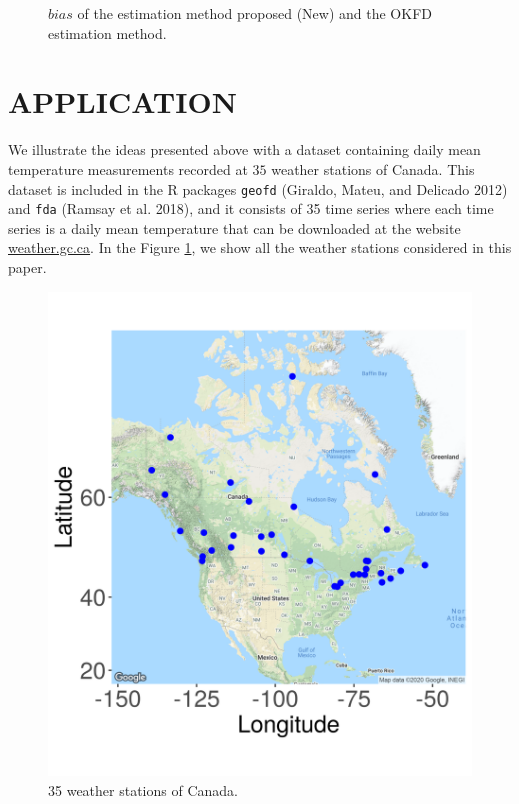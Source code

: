 \documentclass[
  12pt,
]{article}
\theoremstyle{definition}
\theoremstyle{definition}
\theoremstyle{definition}
\theoremstyle{remark}
\begin{document}
\begin{figure}[htbp]
    \caption{$bias$ of the estimation method proposed (New) and the OKFD estimation method.}
\end{figure}

\newpage

\hypertarget{sec:application}{%
\section{APPLICATION}\label{sec:application}}

We illustrate the ideas presented above with a dataset containing daily mean temperature measurements recorded at \(35\) weather stations of Canada. This dataset is included in the R packages \texttt{geofd} (Giraldo, Mateu, and Delicado 2012) and \texttt{fda} (Ramsay et al. 2018), and it consists of 35 time series where each time series is a daily mean temperature that can be downloaded at the website \href{https://weather.gc.ca/}{weather.gc.ca}. In the Figure \ref{fig:weather-stations}, we show all the weather stations
considered in this paper.

\begin{figure}[!htbp]
    \centering

\begin{center}\includegraphics[width=0.45\linewidth]{figure/map_stations_canada} \end{center}
    \caption{35 weather stations  of Canada.}
    \label{fig:weather-stations}
\end{figure}
\end{document}
